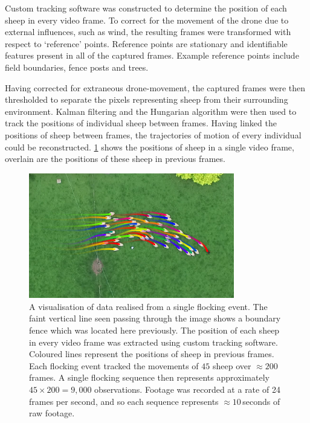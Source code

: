 Custom tracking software was constructed to determine the position of each
sheep in every video frame. To correct for the movement of the drone due to
external influences, such as wind, the resulting frames were transformed with
respect to `reference' points. Reference points are stationary and identifiable
features present in all of the captured frames. Example reference points
include field boundaries, fence posts and trees.

Having corrected for extraneous drone-movement, the captured frames were then
thresholded to separate the pixels representing sheep from their surrounding
environment. Kalman filtering and the Hungarian algorithm were then used to
track the positions of individual sheep between frames. Having linked the
positions of sheep between frames, the trajectories of motion of every
individual could be reconstructed. \cref{fig:sheep_frame} shows the positions
of sheep in a single video frame, overlain are the positions of these sheep in
previous frames.

\begin{figure}[tbp]
  \includegraphics[width=0.8\textwidth]{traj0130_crop.png}
  \caption{A visualisation of data realised from a single flocking event. The
    faint vertical line seen passing through the image shows a boundary fence
    which was located here previously. The position of each sheep in every
    video frame was extracted using custom tracking software. Coloured lines
    represent the positions of sheep in previous frames. Each flocking event
    tracked the movements of $45$ sheep over $\approx200$ frames. A single
    flocking sequence then represents approximately $45\times200=9,000$
    observations. Footage was recorded at a rate of 24 frames per second, and so
    each sequence represents $\approx10$\,seconds of raw footage.}
  \label{fig:sheep_frame}
\end{figure}

